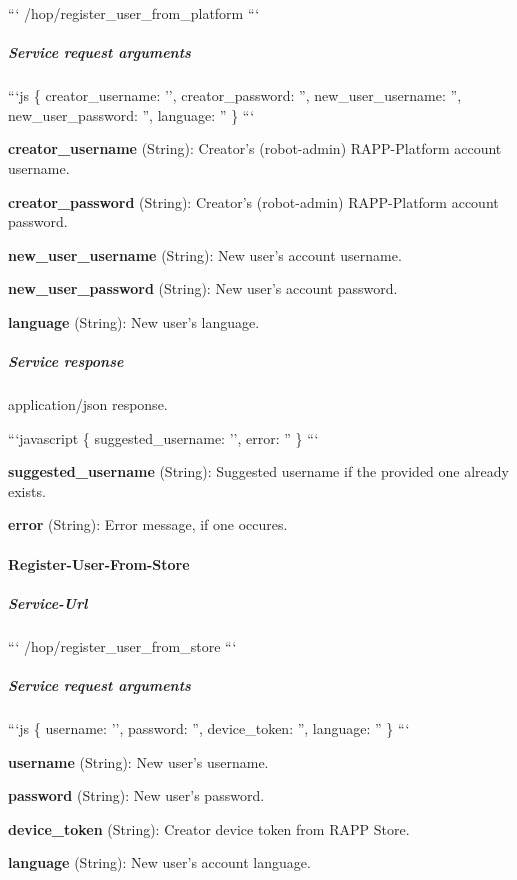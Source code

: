 ``` /hop/register\-\_\-user\-\_\-from\-\_\-platform ```

\subparagraph*{Service request arguments}

```js \{ creator\-\_\-username\-: '', creator\-\_\-password\-: '', new\-\_\-user\-\_\-username\-: '', new\-\_\-user\-\_\-password\-: '', language\-: '' \} ```


\begin{DoxyItemize}
\item {\bfseries creator\-\_\-username} (String)\-: Creator's (robot-\/admin) R\-A\-P\-P-\/\-Platform account username.
\item {\bfseries creator\-\_\-password} (String)\-: Creator's (robot-\/admin) R\-A\-P\-P-\/\-Platform account password.
\item {\bfseries new\-\_\-user\-\_\-username} (String)\-: New user's account username.
\item {\bfseries new\-\_\-user\-\_\-password} (String)\-: New user's account password.
\item {\bfseries language} (String)\-: New user's language.
\end{DoxyItemize}

\subparagraph*{Service response}

application/json response.

```javascript \{ suggested\-\_\-username\-: '', error\-: '' \} ```


\begin{DoxyItemize}
\item {\bfseries suggested\-\_\-username} (String)\-: Suggested username if the provided one already exists.
\item {\bfseries error} (String)\-: Error message, if one occures.
\end{DoxyItemize}

\paragraph*{Register-\/\-User-\/\-From-\/\-Store}

\subparagraph*{Service-\/\-Url}

``` /hop/register\-\_\-user\-\_\-from\-\_\-store ```

\subparagraph*{Service request arguments}

```js \{ username\-: '', password\-: '', device\-\_\-token\-: '', language\-: '' \} ```


\begin{DoxyItemize}
\item {\bfseries username} (String)\-: New user's username.
\item {\bfseries password} (String)\-: New user's password.
\item {\bfseries device\-\_\-token} (String)\-: Creator device token from R\-A\-P\-P Store.
\item {\bfseries language} (String)\-: New user's account language.
\end{DoxyItemize}

